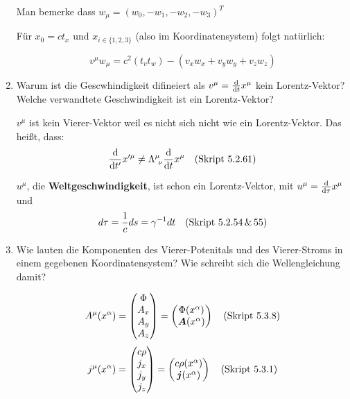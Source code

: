 \begin{enumerate}
    Man bemerke dass $w_\mu=(w_0, -w_1, -w_2, -w_3)^T$

    Für $x_0=ct_x$ und $x_{i\in\{1,2,3\}}$ (also im Koordinatensystem) 
    folgt natürlich:

    \begin{equation*}
      v^\mu w_\mu = c^2(t_vt_w) - (v_xw_x + v_yw_y + v_zw_z)
    \end{equation*}

  \item Warum ist die Gescwhindigkeit difineiert als $v^\mu=\dv t x^\mu$
    kein Lorentz-Vektor? Welche verwandtete Geschwindigkeit ist ein
    Lorentz-Vektor?

    $v^\mu$ ist kein Vierer-Vektor weil es nicht sich nicht
    wie ein Lorentz-Vektor. Das heißt, dass:
    \begin{equation*}
      \dv {t'} x'^\mu \neq \Lambda^{\mu}_{\ \nu}\dv t x^\mu
      \quad\text{(Skript 5.2.61)}
    \end{equation*}

    $u^\mu$, die \textbf{Weltgeschwindigkeit}, 
    ist schon ein Lorentz-Vektor,
    mit $u^\mu=\dv \tau x^\mu$ und
    $$d\tau=\frac{1}{c}ds=\gamma^{-1}dt \quad\text{(Skript 5.2.54\,\&\,55)}$$

  \item Wie lauten die Komponenten des Vierer-Potenitals und des
    Vierer-Stroms in einem gegebenen Koordinatensystem? Wie schreibt
    sich die Wellengleichung damit?

    \begin{equation*}
      A^\mu(x^\alpha)=
      \begin{pmatrix}
        \Phi\\ A_x\\ A_y\\ A_z
      \end{pmatrix}
      =
      \begin{pmatrix}
        \Phi(x^\alpha) \\ \vb* A(x^\alpha)
      \end{pmatrix}
      \quad\text{(Skript 5.3.8)}
    \end{equation*}
    \begin{equation*}
      j^\mu(x^\alpha) =
      \begin{pmatrix}
        c\rho\\ j_x\\ j_y\\ j_z
      \end{pmatrix}
      =
      \begin{pmatrix}
        c\rho(x^\alpha) \\ \vb* j(x^\alpha)
      \end{pmatrix}
      \quad\text{(Skript 5.3.1)}
    \end{equation*}


\end{enumerate}
